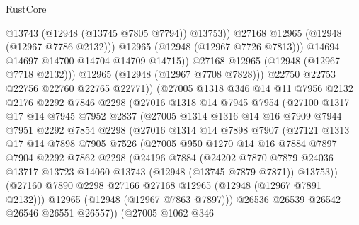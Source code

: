 \begin{lexlean}{RustCore}
\begin{coremodule}
                          @13743
                          (@12948 (@13745 @7805 @7794))
                          @13753))
                      @27168
                      @12965
                      (@12948 (@12967 @7786 @2132)))
                    @12965
                    (@12948 (@12967 @7726 @7813)))
                  @14694
                  @14697
                  @14700
                  @14704
                  @14709
                  @14715))
              @27168
              @12965
              (@12948 (@12967 @7718 @2132)))
            @12965
            (@12948 (@12967 @7708 @7828)))
          @22750
          @22753
          @22756
          @22760
          @22765
          @22771))
      (@27005
        @1318
        @346
        @14
        @11
        @7956
        @2132
        @2176
        @2292
        @7846
        @2298
        (@27016
          @1318
          @14
          @7945
          @7954
          (@27100
            @1317
            @17
            @14
            @7945
            @7952
            @2837
            (@27005
              @1314
              @1316
              @14
              @16
              @7909
              @7944
              @7951
              @2292
              @7854
              @2298
              (@27016
                @1314
                @14
                @7898
                @7907
                (@27121
                  @1313
                  @17
                  @14
                  @7898
                  @7905
                  @7526
                  (@27005
                    @950
                    @1270
                    @14
                    @16
                    @7884
                    @7897
                    @7904
                    @2292
                    @7862
                    @2298
                    (@24196
                      @7884
                      (@24202
                        @7870
                        @7879
                        @24036
                        @13717
                        @13723
                        @14060
                        @13743
                        (@12948 (@13745 @7879 @7871))
                        @13753))
                    (@27160 @7890 @2298 @27166 @27168 @12965 (@12948 (@12967 @7891 @2132)))
                    @12965
                    (@12948 (@12967 @7863 @7897)))
                  @26536
                  @26539
                  @26542
                  @26546
                  @26551
                  @26557))
              (@27005
                @1062
                @346

\end{coremodule}
\end{lexlean}

